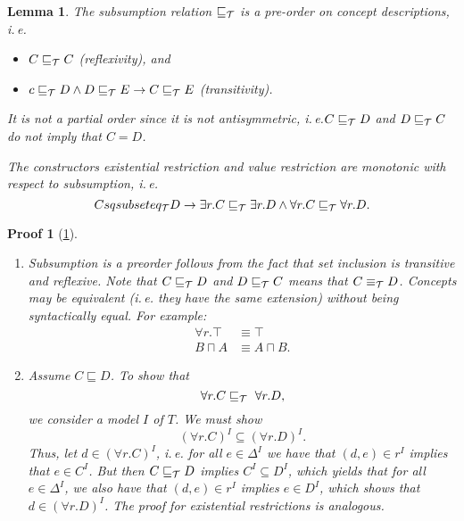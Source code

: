 \documentclass[openany]{scrbook}
\theoremstyle{break}
\newtheorem{Lemma}[Theorem]{Lemma}
\theoremstyle{nonumberbreak}
\theoremstyle{nonumberplain}
\theoremstyle{nonumberbreak}
\newtheorem{Proof}{Proof}
\newcommand{\ie}{i{.}\,e{.}\xspace}
\begin{document}
\begin{Lemma}
  \label{2.14}
  The subsumption relation $\sqsubseteq_{\cal T}$ is a pre-order on
  concept descriptions, \ie
  \begin{itemize}
  \item $C \sqsubseteq_{\cal T} C$ (reflexivity), and
  \item $c \sqsubseteq_{\cal T} D \wedge D \sqsubseteq_{\cal T} E \to
    C \sqsubseteq_{\cal T} E$ (transitivity).
  \end{itemize}

  It is not a partial order since it is not antisymmetric, \ie $C
  \sqsubseteq_{\cal T} D$ and $D \sqsubseteq_{\cal T} C$ do not imply
  that $C = D$.

  The constructors existential restriction and value restriction are
  monotonic with respect to subsumption, \ie
  \begin{equation*}
    C sqsubseteq_{\cal T} D \to \exists r.C \sqsubseteq_{\cal T}
    \exists r.D \wedge \forall r.C \sqsubseteq_{\cal T} \forall r.D.
  \end{equation*}
\end{Lemma}

\begin{Proof}[\cref{2.14}]
  \begin{enumerate}
  \item Subsumption is a preorder follows from the fact that set
    inclusion is transitive and reflexive. Note that $C \sqsubseteq_{\cal T} D$
    and $D \sqsubseteq_{\cal T} C$ means that $C \equiv_{\cal T} D$. Concepts may be
    equivalent (\ie they have the same extension) without being
    syntactically equal. For example:
    \begin{align*}
      \forall r.  \top & \equiv \top \\
      B \sqcap A & \equiv A \sqcap B.
    \end{align*}
  \item Assume $C \sqsubseteq D$. To show that
    \begin{equation*}
      \forall r. C \sqsubseteq_{\cal T}\ \forall r. D,
    \end{equation*}
    we consider a model $I$ of $T$. We must show
    \begin{equation*}
      (\forall r. C)^I \subseteq (\forall r. D)^I.
    \end{equation*}
    Thus, let $d \in (\forall r. C)^I$, \ie for all $e \in \Delta^I$
    we have that $(d, e) \in r^I$ implies that $e \in C^I$. But then
    $C \sqsubseteq_{\cal T} D$ implies $C^I \subseteq D^I$, which yields that
    for all $e \in \Delta^I$, we also have that $(d, e) \in r^I$
    implies $e \in D^I$, which shows that $d \in (\forall
    r. D)^I$. The proof for existential restrictions is analogous.
  \end{enumerate}
\end{Proof}
\end{document}
